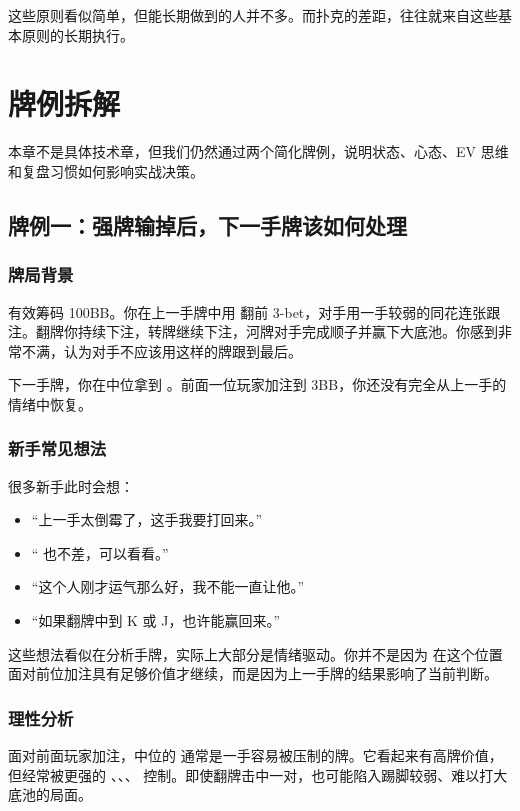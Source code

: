 这些原则看似简单，但能长期做到的人并不多。而扑克的差距，往往就来自这些基本原则的长期执行。

\section{牌例拆解}

本章不是具体技术章，但我们仍然通过两个简化牌例，说明状态、心态、EV 思维和复盘习惯如何影响实战决策。

\subsection{牌例一：强牌输掉后，下一手牌该如何处理}

\subsubsection*{牌局背景}

有效筹码 100BB。你在上一手牌中用  翻前 3-bet，对手用一手较弱的同花连张跟注。翻牌你持续下注，转牌继续下注，河牌对手完成顺子并赢下大底池。你感到非常不满，认为对手不应该用这样的牌跟到最后。

下一手牌，你在中位拿到 。前面一位玩家加注到 3BB，你还没有完全从上一手的情绪中恢复。

\subsubsection*{新手常见想法}

很多新手此时会想：

\begin{itemize}
\item “上一手太倒霉了，这手我要打回来。”
\item “ 也不差，可以看看。”
\item “这个人刚才运气那么好，我不能一直让他。”
\item “如果翻牌中到 K 或 J，也许能赢回来。”
\end{itemize}

这些想法看似在分析手牌，实际上大部分是情绪驱动。你并不是因为  在这个位置面对前位加注具有足够价值才继续，而是因为上一手牌的结果影响了当前判断。

\subsubsection*{理性分析}

面对前面玩家加注，中位的  通常是一手容易被压制的牌。它看起来有高牌价值，但经常被更强的 、、、 控制。即使翻牌击中一对，也可能陷入踢脚较弱、难以打大底池的局面。

